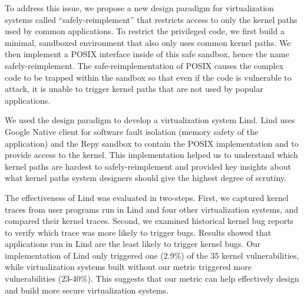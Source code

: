 To address this issue, we propose a new design paradigm for virtualization 
systems called ``safely-reimplement'' that restricts access to only the
kernel paths used by common applications.  To restrict the privileged
code, we first build a minimal, sandboxed environment that also only uses 
common kernel paths.
We then implement a POSIX interface inside of this safe sandbox, hence the
name safely-reimplement. The safe-reimplementation of POSIX causes the
complex code to be trapped within the sandbox so that even if the code
is vulnerable to attack, it is unable to trigger
kernel paths that are not used by popular applications.

We used the design paradigm to develop a virtualization system
Lind.  Lind uses Google Native client for software fault isolation (memory
safety of the application) and the Repy sandbox to contain the POSIX
implementation and to provide access to the kernel.  This implementation
helped us to understand which kernel paths are hardest to
safely-reimplement and provided key insights about what kernel paths system
designers should give the highest degree of scrutiny.

The effectiveness of Lind was evaluated in two-steps. First, we captured
kernel traces from user programs run in Lind and four other virtualization
systems, and compared their kernel traces. Second, we examined historical
kernel bug reports to verify which trace was more likely to trigger bugs.
Results showed that applications run in Lind are the least likely to
trigger kernel bugs. Our implementation of Lind only triggered one (2.9\%)
of the 35 kernel vulnerabilities, while virtualization systems built
without our metric triggered more vulnerabilities (23-40\%). This
suggests that our metric can help effectively design and build more secure
virtualization systems.

